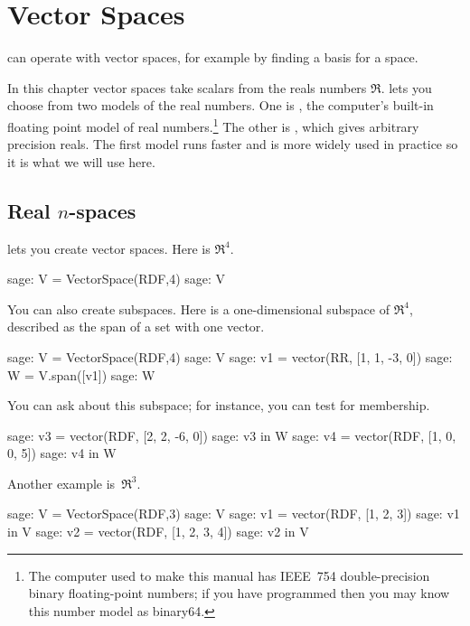 \chapter{Vector Spaces}

\Sage{} can operate with vector spaces, for example by finding a basis for
a space.

In this chapter vector spaces take scalars from the reals numbers $\Re$.
\Sage{} lets you choose from two models of the real numbers.
One is , the computer's built-in floating point
model of real numbers.\footnote{%
  The computer used to make this manual has
  IEEE~754 double-precision binary floating-point numbers;  
  if you have programmed then you may know this number model as binary64.}  
The other is , which gives arbitrary precision 
reals.
The first model runs faster
and is more widely used in practice so it is what we will use here.
 




\section{Real $n$-spaces}

\Sage{} lets you create vector spaces.
Here is $\Re^4$.
\begin{sagecommandline}
sage: V = VectorSpace(RDF,4)
sage: V
\end{sagecommandline}
You can also create subspaces.
Here is a one-dimensional subspace of $\Re^4$, described as the span
of a set with one vector.
\begin{sagecommandline}
sage: V = VectorSpace(RDF,4)
sage: V
sage: v1 = vector(RR, [1, 1, -3, 0])
sage: W = V.span([v1])
sage: W
\end{sagecommandline}

You can ask \Sage{} about this subspace; for instance, you can 
test for membership. 
\begin{sagecommandline}
sage: v3 = vector(RDF, [2, 2, -6, 0])
sage: v3 in W
sage: v4 = vector(RDF, [1, 0, 0, 5])
sage: v4 in W
\end{sagecommandline}

Another example is~$\Re^3$.
\begin{sagecommandline}
sage: V = VectorSpace(RDF,3)
sage: V
sage: v1 = vector(RDF, [1, 2, 3])
sage: v1 in V
sage: v2 = vector(RDF, [1, 2, 3, 4])
sage: v2 in V
\end{sagecommandline}

